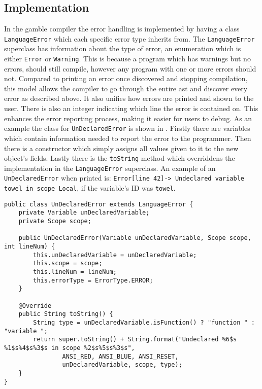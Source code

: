 \subsection*{Implementation}\label{subsec:ImplementationErrorHandling}
In the \gls{gamble} compiler the error handling is implemented by having a class \texttt{LanguageError} which each specific error type inherits from.
The \texttt{LanguageError} superclass has information about the type of error, an enumeration which is either \texttt{Error} or \texttt{Warning}. 
This is because a program which has warnings but no errors, should still compile, however any program with one or more errors should not. 
Compared to printing an error once discovered and stopping compilation, this model allows the compiler to go through the entire \acrshort{ast} and discover every error as described above. 
It also unifies how errors are printed and shown to the user.
There is also an integer indicating which line the error is contained on.
This enhances the error reporting process, making it easier for users to debug. 
As an example the class for \texttt{UnDeclaredError} is shown in .
Firstly there are variables which contain information needed to report the error to the programmer. 
Then there is a constructor which simply assigns all values given to it to the new object's fields.
Lastly there is the \texttt{toString} method which overriddens the implementation in the \texttt{LanguageError} superclass. 
An example of an \texttt{UnDeclaredError} when printed is: \texttt{Error[line   42]-> Undeclared variable towel in scope Local}, if the variable's ID was \texttt{towel}. %

\begin{lstlisting}[caption=The UnDeclaredError class in the \gls{gamble} compiler,numbers=none,frame=tlrb,label={lst:undeclarederrorclass}]
public class UnDeclaredError extends LanguageError {
    private Variable unDeclaredVariable;
    private Scope scope;

    public UnDeclaredError(Variable unDeclaredVariable, Scope scope, int lineNum) {
        this.unDeclaredVariable = unDeclaredVariable;
        this.scope = scope;
        this.lineNum = lineNum;
        this.errorType = ErrorType.ERROR;
    }

    @Override
    public String toString() {
        String type = unDeclaredVariable.isFunction() ? "function " : "variable ";
        return super.toString() + String.format("Undeclared %6$s %1$s%4$s%3$s in scope %2$s%5$s%3$s",
                ANSI_RED, ANSI_BLUE, ANSI_RESET,
                unDeclaredVariable, scope, type);
    }
}
\end{lstlisting}

